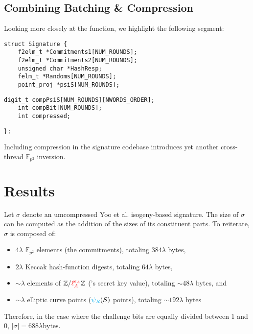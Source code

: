 \subsection{Combining Batching \& Compression}

Looking more closely at the  function, we highlight the following segment:
\begin{lstlisting}
struct Signature {
	f2elm_t *Commitments1[NUM_ROUNDS];
	f2elm_t *Commitments2[NUM_ROUNDS];
	unsigned char *HashResp;
	felm_t *Randoms[NUM_ROUNDS];
	point_proj *psiS[NUM_ROUNDS];
	\end{lstlisting}
\vspace{-0.75\baselineskip}
\begin{lstlisting}[backgroundcolor=\color{light-green}, firstnumber=7]
	digit_t compPsiS[NUM_ROUNDS][NWORDS_ORDER];
	int compBit[NUM_ROUNDS];
	int compressed;
\end{lstlisting}
\vspace{-0.75\baselineskip}
\begin{lstlisting}[firstnumber=10]
};
\end{lstlisting}
\vspace{15px}

Including compression in the signature codebase introduces yet another cross-thread $\mathbb{F}_{p^2}$ inversion. 

\section{Results}

Let $\sigma$ denote an umcompressed Yoo et al. isogeny-based signature. The size of $\sigma$ can be computed as the addition of the sizes of its constituent parts. To reiterate, $\sigma$ is composed of:
\begin{itemize}
\item $4\lambda$ $\mathbb{F}_{p^2}$ elements (the commitments), totaling $384\lambda$ bytes,
\item $2\lambda$ Keccak hash-function digests, totaling $64\lambda$ bytes,
\item $\sim\lambda$ elements of $\mathbb{Z}/\textcolor{red}{\ell_{A}^{e_A}}\mathbb{Z}$ (\randall's secret key value), totaling $\sim48\lambda$ bytes, and
\item $\sim\lambda$ elliptic curve points ($\textcolor{cyan}{\psi_R}(S)$ points), totaling $\sim192\lambda$ bytes
\end{itemize}

Therefore, in the case where the challenge bits are equally divided between $1$ and $0$, $\vert \sigma \vert = 688\lambda \text{bytes}$.   

